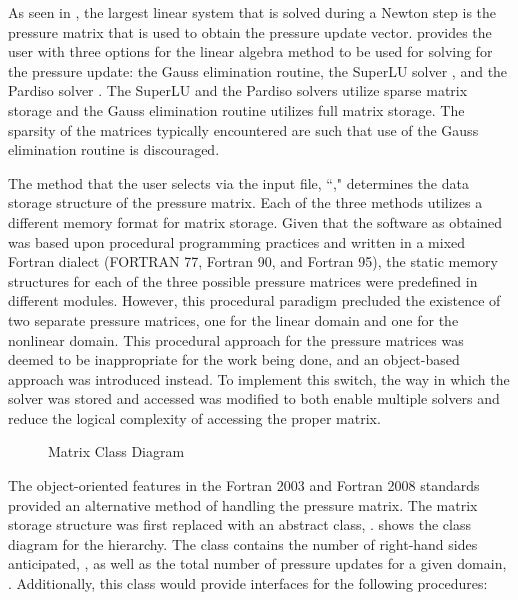 As seen in , the largest linear system that is solved during a Newton step is the pressure matrix that is used to obtain the pressure update vector.
\cobra{} provides the user with three options for the linear algebra method to be used for solving for the pressure update: the Gauss elimination routine, the SuperLU solver \cite{Li1999}, and the Pardiso solver \cite{Schenk2006, Schenk2007}.
The SuperLU and the Pardiso solvers utilize sparse matrix storage and the Gauss elimination routine utilizes full matrix storage.
The sparsity of the matrices typically encountered are such that use of the Gauss elimination routine is discouraged.

The method that the user selects via the \cobra{} input file, ``," determines the data storage structure of the pressure matrix.
Each of the three methods utilizes a different memory format for matrix storage.
Given that the software as obtained was based upon procedural programming practices and written in a mixed Fortran dialect (FORTRAN 77, Fortran 90, and Fortran 95), the static memory structures for each of the three possible pressure matrices were predefined in different modules.
However, this procedural paradigm precluded the existence of two separate pressure matrices, one for the linear domain and one for the nonlinear domain.
This procedural approach for the pressure matrices was deemed to be inappropriate for the work being done, and an object-based approach was introduced instead.
To implement this switch, the way in which the solver was stored and accessed was modified to both enable multiple solvers and reduce the logical complexity of accessing the proper matrix.

\begin{figure}[ht!]
\singlespace\centering

\caption{Matrix Class Diagram}
\label{fig:matrixClassDiagram}
\end{figure}

The object-oriented features in the Fortran 2003 and Fortran 2008 standards provided an alternative method of handling the pressure matrix.
The matrix storage structure was first replaced with an abstract class, .
 shows the class diagram for the  hierarchy.
The  class contains the number of right-hand sides anticipated, , as well as the total number of pressure updates for a given domain, .
Additionally, this class would provide interfaces for the following procedures:

